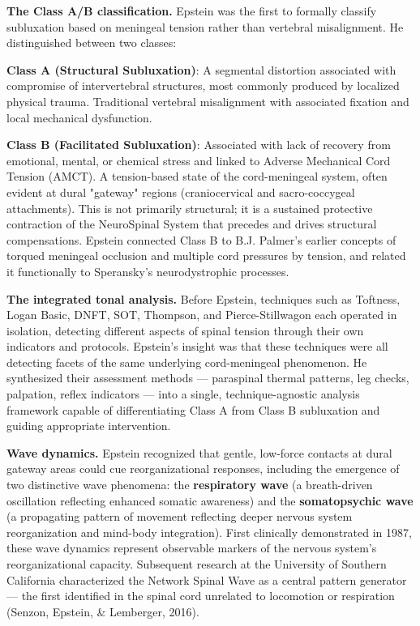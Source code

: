 \documentclass[11pt,letterpaper]{article}
\begin{document}
\textbf{The Class A/B classification.} Epstein was the first to formally classify subluxation based on meningeal tension rather than vertebral misalignment. He distinguished between two classes:


\textbf{Class A (Structural Subluxation)}: A segmental distortion associated with compromise of intervertebral structures, most commonly produced by localized physical trauma. Traditional vertebral misalignment with associated fixation and local mechanical dysfunction.


\textbf{Class B (Facilitated Subluxation)}: Associated with lack of recovery from emotional, mental, or chemical stress and linked to Adverse Mechanical Cord Tension (AMCT). A tension-based state of the cord-meningeal system, often evident at dural "gateway" regions (craniocervical and sacro-coccygeal attachments). This is not primarily structural; it is a sustained protective contraction of the NeuroSpinal System that precedes and drives structural compensations. Epstein connected Class B to B.J. Palmer's earlier concepts of torqued meningeal occlusion and multiple cord pressures by tension, and related it functionally to Speransky's neurodystrophic processes.


\textbf{The integrated tonal analysis.} Before Epstein, techniques such as Toftness, Logan Basic, DNFT, SOT, Thompson, and Pierce-Stillwagon each operated in isolation, detecting different aspects of spinal tension through their own indicators and protocols. Epstein's insight was that these techniques were all detecting facets of the same underlying cord-meningeal phenomenon. He synthesized their assessment methods — paraspinal thermal patterns, leg checks, palpation, reflex indicators — into a single, technique-agnostic analysis framework capable of differentiating Class A from Class B subluxation and guiding appropriate intervention.


\textbf{Wave dynamics.} Epstein recognized that gentle, low-force contacts at dural gateway areas could cue reorganizational responses, including the emergence of two distinctive wave phenomena: the \textbf{respiratory wave} (a breath-driven oscillation reflecting enhanced somatic awareness) and the \textbf{somatopsychic wave} (a propagating pattern of movement reflecting deeper nervous system reorganization and mind-body integration). First clinically demonstrated in 1987, these wave dynamics represent observable markers of the nervous system's reorganizational capacity. Subsequent research at the University of Southern California characterized the Network Spinal Wave as a central pattern generator — the first identified in the spinal cord unrelated to locomotion or respiration (Senzon, Epstein, \& Lemberger, 2016).
\end{document}
